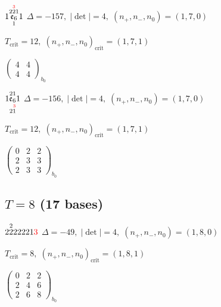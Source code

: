 \documentclass[10pt]{article}
\begin{document}
\smallskip

$1\overset{2\overset{\textcolor{red}{3}}{2}1}{\underset{1}{\mathfrak{e}_6}}1$ \quad $\Delta=-157,\; |\det|=4,\; (n_+,n_-,n_0)=(1,7,0)$

\hspace{1em}$T_{\text{crit}}=12,\; (n_+,n_-,n_0)_{\text{crit}}=(1,7,1)$

\hspace{2em}$\left(\begin{smallmatrix}4 & 4 \\ 4 & 4\end{smallmatrix}\right)_{\!b_0}$

\smallskip

$1\overset{21}{\underset{2\overset{\textcolor{red}{3}}{1}}{\mathfrak{e}_6}}1$ \quad $\Delta=-156,\; |\det|=4,\; (n_+,n_-,n_0)=(1,7,0)$

\hspace{1em}$T_{\text{crit}}=12,\; (n_+,n_-,n_0)_{\text{crit}}=(1,7,1)$

\hspace{2em}$\left(\begin{smallmatrix}0 & 2 & 2 \\ 2 & 3 & 3 \\ 2 & 3 & 3\end{smallmatrix}\right)_{\!b_0}$


\subsection*{$T = 8$ \quad (17 bases)}
\smallskip

$2\overset{2}{2}22221\textcolor{red}{3}$ \quad $\Delta=-49,\; |\det|=4,\; (n_+,n_-,n_0)=(1,8,0)$

\hspace{1em}$T_{\text{crit}}=8,\; (n_+,n_-,n_0)_{\text{crit}}=(1,8,1)$

\hspace{2em}$\left(\begin{smallmatrix}0 & 2 & 2 \\ 2 & 4 & 6 \\ 2 & 6 & 8\end{smallmatrix}\right)_{\!b_0}$

\smallskip
\end{document}
